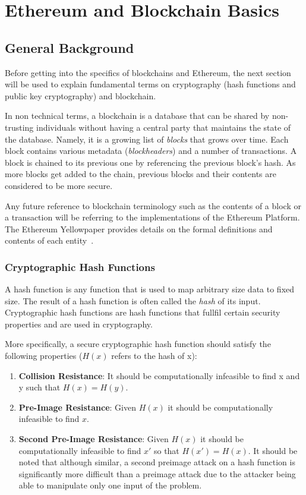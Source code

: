 \chapter{Ethereum and Blockchain Basics}\label{ch:basics}

\section{General Background}
Before getting into the specifics of blockchains and Ethereum, the next section will be used to explain fundamental terms on cryptography (hash functions and public key cryptography) and blockchain.

In non technical terms, a blockchain is a database that can be shared by non-trusting individuals without having a central party that maintains the state of the database. Namely, it is a growing list of \textit{blocks} that grows over time. Each block contains various metadata (\textit{blockheaders}) and a number of transactions. A block is chained to its previous one by referencing the previous block's hash. As more blocks get added to the chain, previous blocks and their contents are considered to be more secure.

Any future reference to blockchain terminology such as the contents of a block or a transaction will be referring to the implementations of the Ethereum Platform. The Ethereum Yellowpaper provides details on the formal definitions and contents of each entity~\cite{ethereum}.

\subsection{Cryptographic Hash Functions}
A hash function is any function that is used to map arbitrary size data to fixed size. The result of a hash function is often called the \textit{hash} of its input. Cryptographic hash functions are hash functions that fullfil certain security properties and are used in cryptography. %

More specifically, a secure cryptographic hash function should satisfy the following properties (\(H(x)\) refers to the hash of x):
\begin{enumerate}
   \item \textbf{Collision Resistance}: It should be computationally infeasible to find x and y such that \(H(x) = H(y)\). 
   \item \textbf{Pre-Image Resistance}: Given \(H(x)\) it should be computationally infeasible to find \(x\).
   \item \textbf{Second Pre-Image Resistance}: Given \(H(x)\) it should be computationally infeasible to find \(x'\) so that \(H(x') = H(x)\). It should be noted that although similar, a second preimage attack on a hash function is significantly more difficult than a preimage attack due to the attacker being able to manipulate only one input of the problem. 
\end{enumerate}

